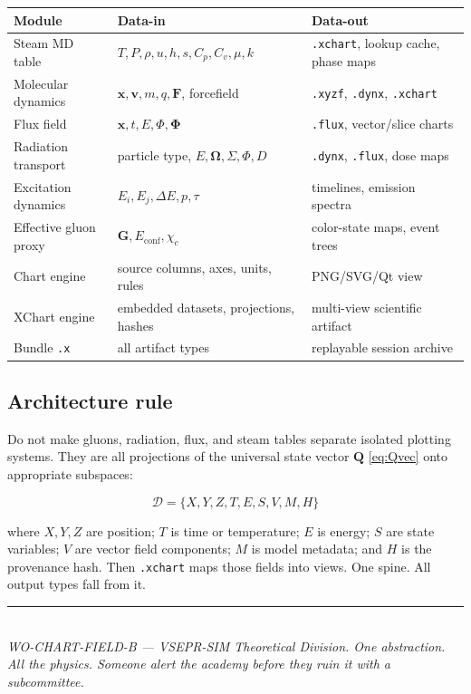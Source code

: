 \documentclass[11pt, a4paper, oneside]{article}
\newcommand{\Qvec}{\mathbf{Q}}           %
\newcommand{\xvec}{\mathbf{x}}
\newcommand{\vvec}{\mathbf{v}}
\newcommand{\Fvec}{\mathbf{F}}
\newcommand{\Phivec}{\bm{\Phi}}
\newcommand{\Omvec}{\bm{\Omega}}         %
\begin{document}
\begin{center}
\begin{tabular}{p{3.2cm}p{4.8cm}p{4.8cm}}
  \toprule
  Module & Data-in & Data-out \\
  \midrule
  Steam MD table
    & $T, P, \rho, u, h, s, C_p, C_v, \mu, k$
    & \texttt{.xchart}, lookup cache, phase maps \\
  Molecular dynamics
    & $\xvec, \vvec, m, q, \Fvec$, forcefield
    & \texttt{.xyzf}, \texttt{.dynx}, \texttt{.xchart} \\
  Flux field
    & $\xvec, t, E, \Phi, \Phivec$
    & \texttt{.flux}, vector/slice charts \\
  Radiation transport
    & particle type, $E, \Omvec, \Sigma, \Phi, D$
    & \texttt{.dynx}, \texttt{.flux}, dose maps \\
  Excitation dynamics
    & $E_i, E_j, \Delta E, p, \tau$
    & timelines, emission spectra \\
  Effective gluon proxy
    & $\mathbf{G}, E_{\mathrm{conf}}, \chi_c$
    & color-state maps, event trees \\
  Chart engine
    & source columns, axes, units, rules
    & PNG/SVG/Qt view \\
  XChart engine
    & embedded datasets, projections, hashes
    & multi-view scientific artifact \\
  Bundle \texttt{.x}
    & all artifact types
    & replayable session archive \\
  \bottomrule
\end{tabular}
\end{center}

\subsection{Architecture rule}

Do not make gluons, radiation, flux, and steam tables separate isolated
plotting systems. They are all projections of the universal state vector
$\Qvec$ \eqref{eq:Qvec} onto appropriate subspaces:

\begin{equation}
  \mathcal{D} = \{X, Y, Z, T, E, S, V, M, H\}
  \label{eq:arch_rule}
\end{equation}

where $X,Y,Z$ are position; $T$ is time or temperature; $E$ is energy; $S$
are state variables; $V$ are vector field components; $M$ is model metadata;
and $H$ is the provenance hash. Then \texttt{.xchart} maps those fields into
views. One spine. All output types fall from it.

\vfill
\begin{center}
  \rule{0.4\textwidth}{0.4pt}\\[0.5em]
  \textit{WO-CHART-FIELD-B --- VSEPR-SIM Theoretical Division.
  One abstraction. All the physics. Someone alert the academy before
  they ruin it with a subcommittee.}
\end{center}
\end{document}
